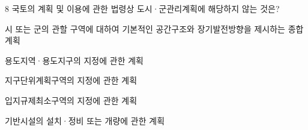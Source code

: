 \begin{question}{8}
국토의 계획 및 이용에 관한 법령상 도시·군관리계획에 해당하지 않는 것은?
\begin{choices}
  \item 시 또는 군의 관할 구역에 대하여 기본적인 공간구조와 장기발전방향을 제시하는 종합계획
  \item 용도지역·용도지구의 지정에 관한 계획
  \item 지구단위계획구역의 지정에 관한 계획
  \item 입지규제최소구역의 지정에 관한 계획
  \item 기반시설의 설치·정비 또는 개량에 관한 계획
\end{choices}
\end{question}
